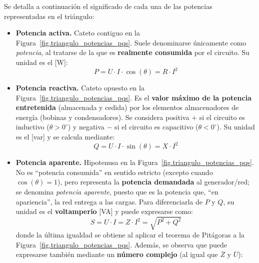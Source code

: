 	Se detalla a continuación el significado de cada una de las
        potencias representadas en el triángulo:
	\begin{itemize}
        \item \textbf{Potencia activa.} Cateto contiguo en la
          Figura~\ref{fig.triangulo_potencias_pqs}. Suele denominarse
          únicamente como \textit{potencia}, al tratarse de la que es
          \textbf{realmente consumida} por el circuito. Su unidad es
          el [W]:
          \begin{equation}\label{eq.Pactiva}
            \boxed{P = U\cdot I\cdot\cos(\theta) = R \cdot I^2}
          \end{equation}
        \item \textbf{Potencia reactiva.} Cateto opuesto en la
          Figura~\ref{fig.triangulo_potencias_pqs}. Es el
          \textbf{valor máximo de la potencia entretenida} (almacenada
          y cedida) por los elementos almacenadores de energía
          (bobinas y condensadores). Se considera positiva $+$ si el
          circuito es inductivo ($\theta>0^\circ$) y negativa $-$ si
          el circuito es capacitivo ($\theta<0^\circ$). Su unidad es
          el [var] y se calcula mediante:
          \begin{equation}\label{eq.Qreactiva}
            \boxed{Q = U\cdot I\cdot\sin(\theta) = X \cdot I^2}
          \end{equation}
        \item \textbf{Potencia aparente.} Hipotenusa en la
          Figura~\ref{fig.triangulo_potencias_pqs}. No es ``potencia
          consumida'' en sentido estricto (excepto cuando
          $\cos(\theta)=1$), pero representa la \textbf{potencia
            demandada} al generador/red; se denomina \textit{potencia
            aparente}, puesto que es la potencia que, ``en
          apariencia'', la red entrega a las cargas. Para
          diferenciarla de $P$ y $Q$, su unidad es el
          \textbf{voltamperio} [VA] y puede expresarse como:
          \begin{equation}\label{eq.Saparente}
            \boxed{S = U\cdot I= Z \cdot I^2=\sqrt{P^2+Q^2}}
          \end{equation}
          donde la última igualdad se obtiene al aplicar el teorema de
          Pitágoras a la
          Figura~\ref{fig.triangulo_potencias_pqs}. Además, se observa
          que puede expresarse también mediante un \textbf{número
            complejo} (al igual que $\overline{Z}$ y $\overline{U}$):
          \begin{equation}

\end{equation}
\end{itemize}

